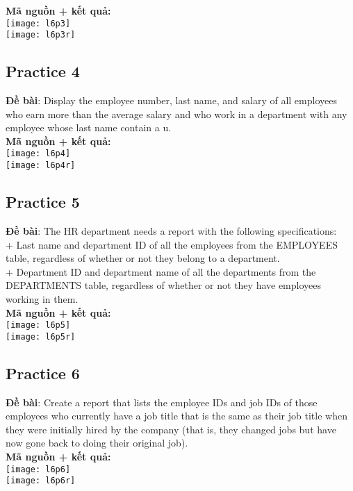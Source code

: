 \documentclass[a4paper]{report}
\begin{document}
\textbf{Mã nguồn + kết quả: }\\
\texttt{[image: l6p3]}\\
\texttt{[image: l6p3r]}

\subsection{Practice 4}
\noindent
\textbf{Đề bài}: Display the employee number, last name, and salary of all employees who earn more than the average salary and who work in a department with any employee whose last name contain a u.\\

\textbf{Mã nguồn + kết quả: }\\
\texttt{[image: l6p4]}\\
\texttt{[image: l6p4r]}

\subsection{Practice 5}
\noindent
\textbf{Đề bài}: The HR department needs a report with the following specifications:\\
+ Last name and department ID of all the employees from the EMPLOYEES table, regardless of whether or not they belong to a department. \\
+ Department ID and department name of all the departments from the DEPARTMENTS table, regardless of whether or not they have employees working in them.\\

\textbf{Mã nguồn + kết quả: }\\
\texttt{[image: l6p5]}\\
\texttt{[image: l6p5r]}

\subsection{Practice 6}
\noindent
\textbf{Đề bài}: Create a report that lists the employee IDs and job IDs of those employees who currently have a job title that is the same as their job title when they were initially hired by the company (that is, they changed jobs but have now gone back to doing their original job).\\

\textbf{Mã nguồn + kết quả: }\\
\texttt{[image: l6p6]}\\
\texttt{[image: l6p6r]}
\end{document}
